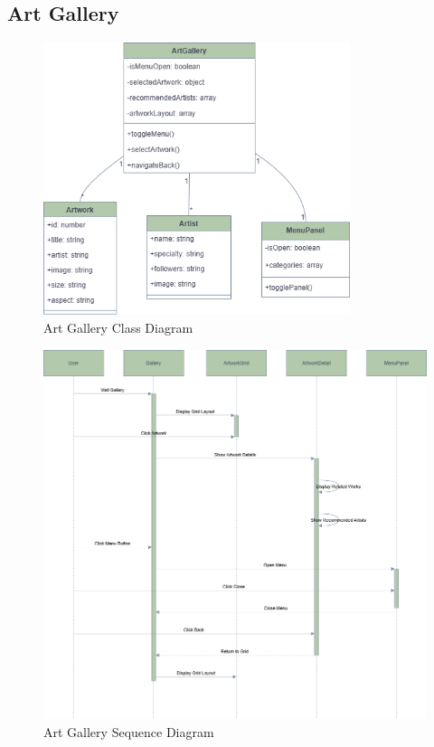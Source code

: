 \documentclass[]{project_interim}
\begin{document}
\newpage

\subsection{Art Gallery}

\begin{figure}[ht!]
  \centering
  \includegraphics[width=0.8\textwidth]{Art Gallery Class Diagram.png}
  \vspace*{0.0cm}
  \caption{Art Gallery Class Diagram}
  \label{fig:1}
\end{figure}
\newpage
\begin{figure}[ht!]
  \centering
  \includegraphics[width=\textwidth]{Art Gallery Sequence Diagram.png}
  \vspace*{0.0cm}
  \caption{Art Gallery Sequence Diagram}
  \label{fig:1}
\end{figure}
\end{document}
